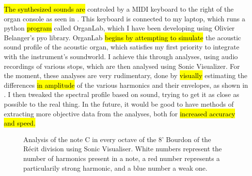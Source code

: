 \documentclass[12pt,twoside,maitrise]{dms_ks}
\theoremstyle{definition}
\begin{document}
{\hl{The synthesized sounds are} controled by a MIDI keyboard to the right of the organ console as seen in . 
This keyboard is connected to my laptop, which runs a python \hl{program} called OrganLab, which I have been developing using Olivier Belanger's pyo library. 
OrganLab \hl{begins by attempting to simulate} the acoustic sound profile of the acoustic organ, which satisfies my first priority to integrate with the instrument's soundworld. 
I achieve this through analyses, using audio recordings of various stops, which are then analysed using Sonic Visualizer. 
For the moment, these analyses are very rudimentary, done  by \hl{visually} estimating the differences \hl{in amplitude }of the various harmonics and their envelopes, as shown in . 
I then tweaked the spectral profile based on sound, trying to get it as close as possible to the real thing. 
In the future, it would be good to have methods of extracting more objective data from the analyses, both for \hl{increased accuracy and speed.}

\begin{figure}[h]
    \centering
	\caption{Analysis of the note C in every octave of the 8' Bourdon of the Récit division using Sonic Visualiser. White numbers represent the number of harmonics present in a note, a red number represents a particularily strong harmonic, and a blue number a weak one.}
    \label{fig:bourdon_analysis}
\end{figure}

}
\end{document}
